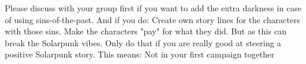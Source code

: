 Please discuss with your group first if you want to add the extra darkness in case of using sins-of-the-past. And if you do: Create own story lines for the characters with those sins. Make the characters "pay" for what they did. But as this can break the Solarpunk vibes. Only do that if you are really good at steering a positive Solarpunk story. This means: Not in your first campaign together